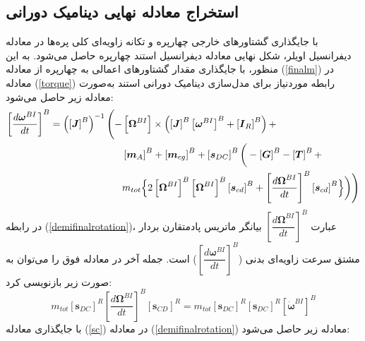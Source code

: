 \subsection{ استخراج معادله نهایی دينامیک دورانی}
با جایگذاری گشتاورهای خارجی چهارپره و تكانه زاویه‌ای کلی پره‌ها در معادله دیفرانسیل اویلر، شكل نهایی معادله دیفرانسیل استند چهارپره حاصل می‌شود. به این منظور، با جایگذاری مقدار 
گشتاورهای اعمالی به چهارپره از معادله
(\ref{finalm})
در معادله 
(\ref{torque})
رابطه موردنیاز برای مدل‌سازی
دینامیک دورانی استند به‌صورت معادله زیر حاصل می‌شود:
\begin{equation}\label{demifinalrotation}
	\begin{split}
		\left[\dfrac{d\boldsymbol\omega^{BI}}{dt}\right]^B = 
		\left(\left[\boldsymbol J\right]^B\right)^{-1}\Bigg(
		-&\left[\boldsymbol\Omega^{BI}\right]\times\left(
		\left[\boldsymbol J\right]^B\left[\boldsymbol\omega^{BI}\right]^B
		+\left[\boldsymbol I_R\right]^B\right) + \\
		&\left[\boldsymbol m_A\right]^B + \left[\boldsymbol m_{cg}\right]^B +\left[\boldsymbol s_{DC}\right]^B
		\bigg(-\left[\boldsymbol G\right]^B
		-\left[\boldsymbol T\right]^B+ \\
		&m_{tot}\Bigl\{2
		\left[\boldsymbol \Omega^{BI}\right]^B
		\left[\boldsymbol \Omega^{BI}\right]^B
		\left[\boldsymbol s_{cd}\right]^B+
		\left[\dfrac{d\boldsymbol\Omega^{BI}}{dt}\right]^B
		\left[\boldsymbol s_{cd}\right]^B
		\Bigr\}\bigg)\Bigg)
	\end{split}
\end{equation}
در رابطه
(\ref{demifinalrotation})،
عبارت
$\left[\dfrac{d\boldsymbol\Omega^{BI}}{dt}\right]^B$
بیانگر ماتریس پادمتقارن بردار مشتق سرعت‌ زاویه‌ای بدنی
($\left[\dfrac{d\boldsymbol\omega^{BI}}{dt}\right]^B $)
است. جمله آخر در معادله فوق را می‌توان به صورت زیر بازنویسی کرد:
\begin{equation}\label{sc}
	m_{tot}\left[\boldsymbol s_{DC}\right]^R
	\left[\dfrac{d\boldsymbol\Omega^{BI}}{dt}\right]^B\left[\boldsymbol s_{CD}\right]^R = 
	m_{tot}\left[\boldsymbol s_{DC}\right]^R\left[\boldsymbol s_{DC}\right]^R
	\left[\dot{\boldsymbol\omega}^{BI}\right]^B
\end{equation}
با جایگذاری معادله
(\ref{sc})
در معادله
(\ref{demifinalrotation})
معادله زیر حاصل می‌شود:
